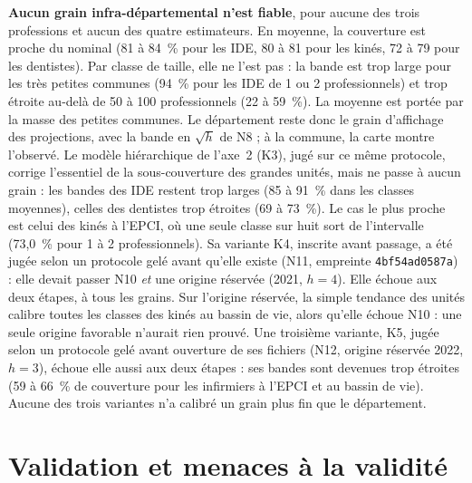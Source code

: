\documentclass[11pt]{article}
\begin{document}
\textbf{Aucun grain infra-départemental n'est fiable}, pour aucune des trois professions et aucun des
quatre estimateurs. En moyenne, la couverture est proche du nominal (81 à 84\mesure{}~\% pour les IDE,
80 à 81 pour les kinés, 72 à 79 pour les dentistes). Par classe de taille, elle ne l'est pas : la bande
est trop large pour les très petites communes (94\mesure{}~\% pour les IDE de 1 ou 2
professionnels) et trop étroite au-delà de 50 à 100 professionnels (22 à 59\mesure{}~\%). La moyenne
est portée par la masse des petites communes. Le département reste donc le grain d'affichage des
projections, avec la bande en $\sqrt h$ de N8 ; à la commune, la carte montre l'observé. Le modèle
hiérarchique de l'axe~2 (K3), jugé sur ce même protocole, corrige l'essentiel de la sous-couverture
des grandes unités, mais ne passe à aucun grain : les bandes des IDE restent trop larges (85 à
91\mesure{}~\% dans les classes moyennes), celles des dentistes trop étroites (69 à 73\mesure{}~\%).
Le cas le plus proche est celui des kinés à l'EPCI, où une seule classe sur huit sort de l'intervalle
(73,0\mesure{}~\% pour 1 à 2 professionnels). Sa variante K4, inscrite avant passage, a été jugée selon un protocole gelé avant
qu'elle existe (N11, empreinte \texttt{4bf54ad0587a}) : elle devait passer N10 \emph{et} une origine
réservée (2021, $h = 4$). Elle échoue aux deux étapes, à tous les grains. Sur l'origine réservée, la simple
tendance des unités calibre toutes les classes des kinés au bassin de vie, alors qu'elle échoue N10 :
une seule origine favorable n'aurait rien prouvé. Une troisième variante, K5, jugée selon un protocole gelé avant ouverture de ses fichiers (N12,
origine réservée 2022, $h = 3$), échoue elle aussi aux deux étapes : ses bandes sont devenues trop
étroites (59 à 66\mesure{}~\% de couverture pour les infirmiers à l'EPCI et au bassin de vie). Aucune des
trois variantes n'a calibré un grain plus fin que le département.

\section{Validation et menaces à la validité}\label{sec:menaces}
\end{document}
